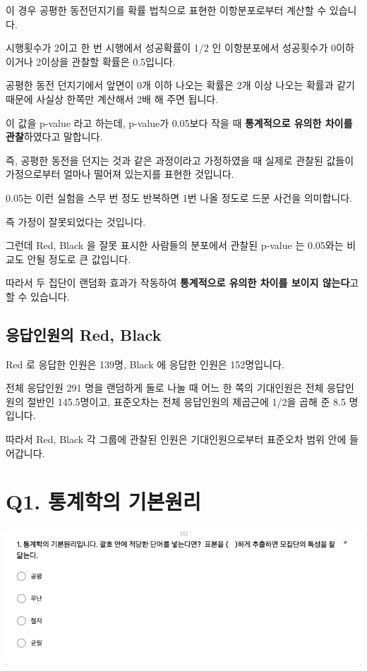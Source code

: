 \documentclass[
]{book}
\begin{document}
이 경우 공평한 동전던지기를 확률 법칙으로 표현한 이항분포로부터 계산할 수 있습니다.

시행횟수가 2이고 한 번 시행에서 성공확률이 1/2 인 이항분포에서 성공횟수가 0이하이거나 2이상을 관찰할 확률은 0.5입니다.

공평한 동전 던지기에서 앞면이 0개 이하 나오는 확률은 2개 이상 나오는 확률과 같기 때문에 사실상 한쪽만 계산해서 2배 해 주면 됩니다.

이 값을 p-value 라고 하는데, p-value가 0.05보다 작을 때 \textbf{통계적으로 유의한 차이를 관찰}하였다고 말합니다.

즉, 공평한 동전을 던지는 것과 같은 과정이라고 가정하였을 때 실제로 관찰된 값들이 가정으로부터 얼마나 떨어져 있는지를 표현한 것입니다.

0.05는 이런 실험을 스무 번 정도 반복하면 1번 나올 정도로 드문 사건을 의미합니다.

즉 가정이 잘못되었다는 것입니다.

그런데 Red, Black 을 잘못 표시한 사람들의 분포에서 관찰된 p-value 는 0.05와는 비교도 안될 정도로 큰 값입니다.

따라서 두 집단이 랜덤화 효과가 작동하여 \textbf{통계적으로 유의한 차이를 보이지 않는다}고 할 수 있습니다.

\subsection{응답인원의 Red, Black}\label{uxc751uxb2f5uxc778uxc6d0uxc758-red-black-6}

Red 로 응답한 인원은 139명, Black 에 응답한 인원은 152명입니다.

전체 응답인원 291 명을 랜덤하게 둘로 나눌 때 어느 한 쪽의 기대인원은 전체 응답인원의 절반인 145.5명이고, 표준오차는 전체 응답인원의 제곱근에 1/2을 곱해 준 8.5 명입니다.

따라서 Red, Black 각 그룹에 관찰된 인원은 기대인원으로부터 표준오차 범위 안에 들어갑니다.

\section{Q1. 통계학의 기본원리}\label{q1.-uxd1b5uxacc4uxd559uxc758-uxae30uxbcf8uxc6d0uxb9ac}

\begin{flushleft}\includegraphics[width=0.75\linewidth]{./pics/Quiz210406_Q1} \end{flushleft}
\end{document}
